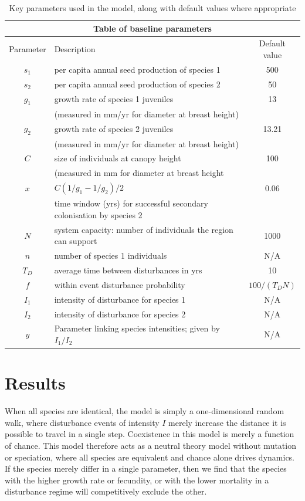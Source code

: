 \begin{table}[htdp]
\begin{center}
\begin{tabular}{|c|l|c|} \hline
\multicolumn{3}{|c|}{Table of baseline parameters} \\ \hline
Parameter & Description & Default value \\ \hline
$s_1$ & per capita annual seed production of species 1 & 500 \\ \hline
$s_2$ & per capita annual seed production of species 2 & 50\\ \hline
$g_1$&growth rate of species 1 juveniles & 13 \\
&(measured in mm/yr for diameter at breast height) &\\ \hline
$g_2$&growth rate of species 2 juveniles & 13.21 \\
&(measured in mm/yr for diameter at breast height) &\\ \hline
$C$& size of individuals at canopy height & 100 \\
& (measured in mm for diameter at breast height&\\ \hline
$x$&$C(1/g_1-1/g_2)/2$&0.06\\
&time window (yrs) for successful secondary colonisation by species 2&\\ \hline
$N$ & system capacity: number of individuals the region can support & 1000 \\ \hline
$n$ & number of species 1 individuals & N/A \\ \hline
$T_D$& average time between disturbances in yrs & 10 \\ \hline
$f$& within event disturbance probability & $100/(T_D N)$ \\ \hline
$I_1$& intensity of disturbance for species 1 & N/A \\ \hline
$I_2$& intensity of disturbance for species 2 & N/A \\ \hline
$y$ &Parameter linking species intensities; given by $I_1/I_2$ & N/A \\ \hline
\end{tabular} \end{center}
\caption[Key model parameters]{Key parameters used in the model, along with default values where appropriate}
\label{tabparas} 
\end{table}

\section{Results}
When all species are identical, the model is simply a one-dimensional random walk, where disturbance events of intensity $I$ merely increase the distance it is possible to travel in a single step. Coexistence in this model is merely a function of chance. This model therefore acts as a neutral theory model without mutation or speciation, where all species are equivalent and chance alone drives dynamics. If the species merely differ in a single parameter, then we find that the species with the higher growth rate or fecundity, or with the lower mortality in a disturbance regime will competitively exclude the other.

